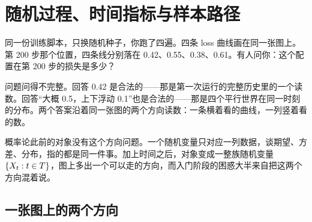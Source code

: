 \section{随机过程、时间指标与样本路径}
\label{sec:06-Random-Processes/01-Foundations/01}

同一份训练脚本，只换随机种子，你跑了四遍。四条 loss 曲线画在同一张图上。第 200 步那个位置，四条线分别落在 0.42、0.55、0.38、0.61。有人问你：这个配置在第 200 步的损失是多少？

问题问得不完整。回答 0.42 是合法的——那是第一次运行的完整历史里的一个读数。回答``大概 0.5，上下浮动 0.1''也是合法的——那是四个平行世界在同一时刻的分布。两个答案沿着同一张图的两个方向读数：一条横着看的曲线，一列竖着看的数。

概率论此前的对象没有这个方向问题。一个随机变量只对应一列数据，谈期望、方差、分布，指的都是同一件事。加上时间之后，对象变成一整族随机变量 \(\left\{X_t : t \in T\right\}\)，图上多出一个可以走的方向，而入门阶段的困惑大半来自把这两个方向混着说。

\subsection{一张图上的两个方向}

